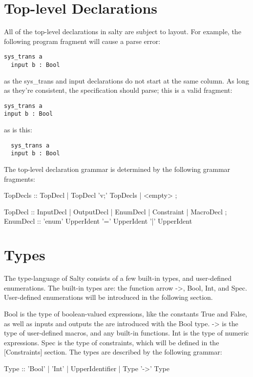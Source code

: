 \section{Top-level Declarations}

All of the top-level declarations in salty are subject to layout. For example, the following program fragment will cause a parse error:
\begin{lstlisting}
sys_trans a
  input b : Bool
\end{lstlisting}
\noindent as the sys\_trans and input declarations do not start at the same column. As long as they're consistent, the specification should parse; this is a valid fragment:
\begin{lstlisting}
sys_trans a
input b : Bool
\end{lstlisting}
\noindent as is this:
\begin{lstlisting}
  sys_trans a
  input b : Bool
\end{lstlisting}
\noindent The top-level declaration grammar is determined by the following grammar fragments:
\begin{Grammar}
  TopDecls :: TopDecl | TopDecl 'v;' TopDecls | <empty> ;

  TopDecl :: InputDecl | OutputDecl | EnumDecl
        | Constraint | MacroDecl ;
  EnumDecl :: 'enum' UpperIdent '=' UpperIdent { '|' UpperIdent }
\end{Grammar}

\section{Types}

The type-language of Salty consists of a few built-in types, and user-defined enumerations. The built-in types are: the function arrow ->, Bool, Int, and Spec. User-defined enumerations will be introduced in the following section.

Bool is the type of boolean-valued expressions, like the constants True and False, as well as inputs and outputs the are introduced with the Bool type.
-> is the type of user-defined macros, and any built-in functions.
Int is the type of numeric expressions.
Spec is the type of constraints, which will be defined in the [Constraints] section.
The types are described by the following grammar:

\begin{Grammar}
  Type :: 'Bool' | 'Int' | UpperIdentifier | Type '->' Type
\end{Grammar}

